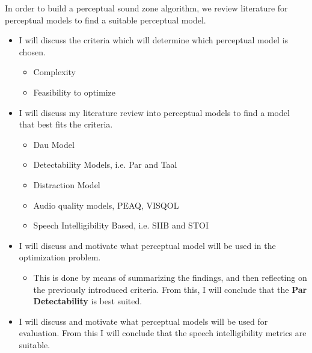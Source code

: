 In order to build a perceptual sound zone algorithm, we review literature for perceptual models to find a suitable perceptual model.
\begin{itemize}
    \item I will discuss the criteria which will determine which perceptual model is chosen.
        \begin{itemize}
            \item Complexity
            \item Feasibility to optimize
        \end{itemize}
    \item I will discuss my literature review into perceptual models to find a model that best fits the criteria.
        \begin{itemize}
            \item Dau Model
            \item Detectability Models, i.e. Par and Taal
            \item Distraction Model
            \item Audio quality models, PEAQ, VISQOL
            \item Speech Intelligibility Based, i.e. SIIB and STOI
        \end{itemize}
    \item I will discuss and motivate what perceptual model will be used in the optimization problem.
        \begin{itemize}
            \item This is done by means of summarizing the findings, and then reflecting on the previously introduced
                criteria.
        From this, I will conclude that the \textbf{Par Detectability} is best suited.
        \end{itemize}
        
    \item I will discuss and motivate what perceptual models will be used for evaluation.
        From this I will conclude that the speech intelligibility metrics are suitable.
\end{itemize}
